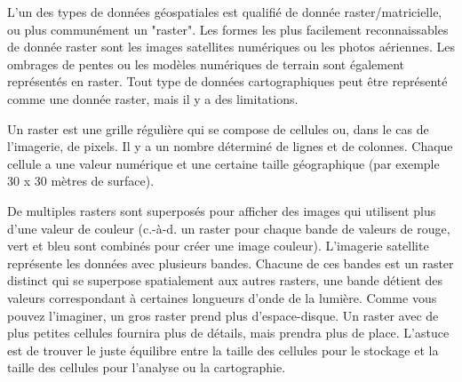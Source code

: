L'un des types de donn\'ees g\'eospatiales est qualifi\'e de donn\'ee raster/matricielle, ou plus commun\'ement un "raster". Les formes les plus facilement reconnaissables de donn\'ee raster sont les images satellites num\'eriques ou les photos a\'eriennes. Les ombrages de pentes ou les mod\`eles num\'eriques de terrain sont \'egalement repr\'esent\'es en raster. Tout type de donn\'ees cartographiques peut \^etre repr\'esent\'e comme une donn\'ee raster, mais il y a des limitations.

Un raster est une grille r\'eguli\`ere qui se compose de cellules ou, dans le cas de l'imagerie, de pixels. Il y a un nombre d\'etermin\'e de lignes et de colonnes. Chaque cellule a une valeur num\'erique et une certaine taille g\'eographique (par exemple 30 x 30 m\`etres de surface).

De multiples rasters sont superpos\'es pour afficher des images qui utilisent plus d'une valeur de couleur (c.-\`a-d. un raster pour chaque bande de valeurs de rouge, vert et bleu sont combin\'es pour cr\'eer une image couleur). L'imagerie satellite repr\'esente les donn\'ees avec plusieurs bandes. Chacune de ces bandes est un raster distinct qui se superpose spatialement aux autres rasters, une bande d\'etient des valeurs correspondant \`a certaines longueurs d'onde de la lumi\`ere. Comme vous pouvez l'imaginer, un gros raster prend plus d'espace-disque. Un raster avec de plus petites cellules fournira plus de d\'etails, mais prendra plus de place. L'astuce est de trouver le juste \'equilibre entre la taille des cellules pour le stockage et la taille des cellules pour l'analyse ou la cartographie.

%
%
%
%

